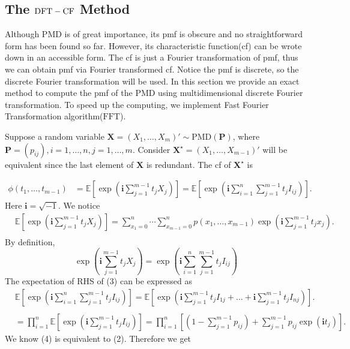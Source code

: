 \documentclass[12pt]{article}
\newcommand{\EE}{\mathbb{E}}
\newcommand{\Pmat}{\mathbf{P}}
\newcommand{\ivec}{{\boldsymbol{i}}}
\newcommand{\PMD}{\textrm{PMD}}
\newcommand{\Xvec}{\boldsymbol{X}}
\newcommand{\fft}{\textrm{FFT}}
\newcommand{\dft}{{\rm DFT-CF}}
\begin{document}
\subsection{The $\dft$ Method}
Although $\PMD$ is of great importance, its pmf is obscure and no straightforward form has been found so far. However, its characteristic function(cf) can be wrote down in an accessible form. The cf is just a Fourier transformation of pmf, thus we can obtain pmf via Fourier transformed cf. Notice the pmf is discrete, so the discrete Fourier transformation will be used. In this section we provide an exact method to compute the pmf of the PMD using multidimensional discrete Fourier transformation. To speed up the computing, we implement Fast Fourier Transformation algorithm($\fft$). %

Suppose a random variable $\Xvec =  (X_1, \dots, X_{m})' \sim \PMD(\Pmat)$, where $\Pmat = (p_{ij}), i=1,\dots,n,j=1,\dots,m$. Consider $\Xvec^{\star} = (X_1, \dots, X_{m-1})'$ will be equivalent since the last element of $\Xvec$ is redundant. The cf of $\Xvec^{\star}$ is 

\begin{align}
\phi(t_1, \dots, t_{m-1}) & = \EE\left[\exp\left(\ivec\sum_{j=1}^{m-1}t_jX_j\right)\right]=\EE\left[\exp\left(\ivec\sum_{i = 1}^n \sum_{j=1}^{m-1}t_j I_{ij}\right)\right].
\end{align}
Here $\ivec=\sqrt{-1}$. We notice
\begin{equation}
\begin{split}
  &\EE\left[\exp\left(\ivec\sum_{j=1}^{m-1}t_jX_j\right)\right] = \sum_{x_1 = 0}^{n}\cdots \sum_{x_{m-1} = 0}^n p(x_1,\ldots,x_{m-1})\exp\left(\ivec\sum_{j=1}^{m-1}t_jx_j\right).\\
\end{split}
\end{equation}
By definition, 
\begin{equation}
\exp\left(\ivec\sum_{j=1}^{m-1}t_jX_j\right)= \exp\left(\ivec\sum_{i = 1}^n \sum_{j=1}^{m-1}t_j I_{ij}\right)
\end{equation}
The expectation of RHS of (3) can be expressed as
\begin{equation}
\begin{split}
  &\EE\left[\exp\left(\ivec\sum_{i = 1}^n \sum_{j=1}^{m-1}t_j I_{ij}\right)\right] = \EE\left[ \exp\left( \ivec\sum_{j=1}^{m-1} t_jI_{1j} + \dots + \ivec\sum_{j=1}^{m-1} t_jI_{nj}\right)\right].\\
  \\
  & = \prod_{i=1}^n \EE\left[ \exp\left( \ivec \sum_{j=1}^{m-1} t_j I_{ij}\right)\right] = \prod_{i=1}^n \left[(1 - \sum_{j=1}^{m-1}p_{ij})+\sum_{j=1}^{m-1}p_{ij}\exp(\ivec t_j)\right].
\end{split}
\end{equation}
We know (4) is equivalent to (2). Therefore we get
\end{document}
